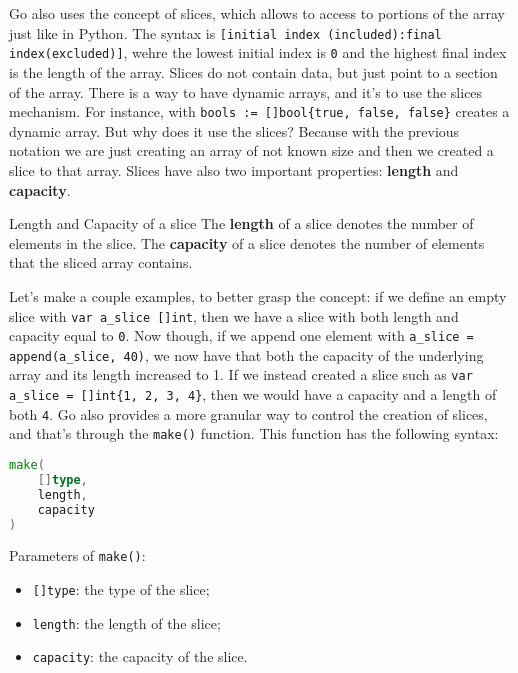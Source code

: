 Go also uses the concept of slices, which allows to access to portions of the array just like in Python. The syntax is \verb|[initial index (included):final index(excluded)]|, wehre the lowest initial index is \verb|0| and the highest final index is the length of the array. Slices do not contain data, but just point to a section of the array.
\nwl
There is a way to have dynamic arrays, and it's to use the slices mechanism. For instance, with \verb|bools := []bool{true, false, false}| creates a dynamic array. But why does it use the slices? Because with the previous notation we are just creating an array of not known size and then we created a slice to that array.
\nwl
Slices have also two important properties: \textbf{length} and \textbf{capacity}.

\begin{definition}{Length and Capacity of a slice}
    The \textbf{length} of a slice denotes the number of elements in the slice.
    \nwl\nwl
    The \textbf{capacity} of a slice denotes the number of elements that the sliced array contains.
\end{definition}

Let's make a couple examples, to better grasp the concept: if we define an empty slice with \verb|var a_slice []int|, then we have a slice with both length and capacity equal to \verb|0|. Now though, if we append one element with \verb|a_slice = append(a_slice, 40)|, we now have that both the capacity of the underlying array and its length increased to 1. If we instead created a slice such as \verb|var a_slice = []int{1, 2, 3, 4}|, then we would have a capacity and a length of both \verb|4|.
\nwl
Go also provides a more granular way to control the creation of slices, and that's through the \verb|make()| function. This function has the following syntax:

\begin{codedefine}
    \begin{lstlisting}[language = go]
make(
    []type,
    length,
    capacity
)\end{lstlisting}
\tcblower
Parameters of \verb|make()|:
\begin{itemize}
    \item \verb|[]type|: the type of the slice;
    \item \verb|length|: the length of the slice;
    \item \verb|capacity|: the capacity of the slice.
\end{itemize}
\end{codedefine}

